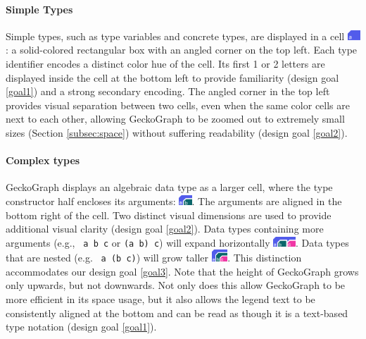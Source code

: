 \documentclass[preprint,12pt]{elsarticle}
\begin{document}
\paragraph{Simple Types} 
Simple types, such as type variables and concrete types, are displayed in a cell \includegraphics[height=1em]{figures/SimpleType}: a solid-colored rectangular box with an angled corner on the top left. Each type identifier encodes a distinct color hue of the cell. Its first 1 or 2 letters are displayed inside the cell at the bottom left to provide familiarity (design goal \ref{goal1}) and a strong secondary encoding. The angled corner in the top left provides visual separation between two cells, even when the same color cells are next to each other, allowing GeckoGraph to be zoomed out to extremely small sizes (Section \ref{subsec:space}) without suffering readability (design goal \ref{goal2}).



\paragraph{Complex types}
GeckoGraph displays an algebraic data type as a larger cell, where the type constructor half encloses its arguments: \includegraphics[height=1em]{figures/DataType.png}. The arguments are aligned in the bottom right of the cell. Two distinct visual dimensions are used to provide additional visual clarity (design goal \ref{goal2}). Data types containing more arguments (e.g., \texttt{ a b c} or \texttt{(a b) c}) will expand horizontally \includegraphics[height=1em]{figures/DataTypeWide.png}. Data types that are nested (e.g. \texttt{ a (b c)}) will grow taller \includegraphics[height=1.2em]{figures/DataTypeNested.png}. This distinction accommodates our design goal \ref{goal3}. Note that the height of GeckoGraph grows only upwards, but not downwards. Not only does this allow GeckoGraph to be more efficient in its space usage, but it also allows the legend text to be consistently aligned at the bottom and can be read as though it is a text-based type notation (design goal \ref{goal1}).  
\end{document}
